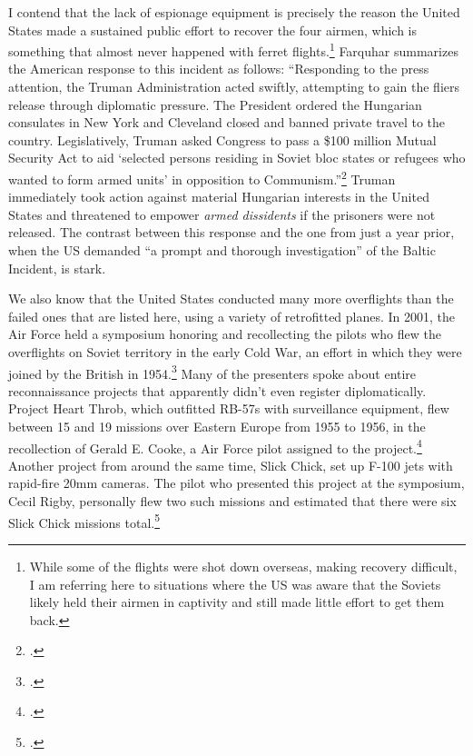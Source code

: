 \documentclass[14pt]{extarticle}
\begin{document}
I contend that the lack of espionage equipment is precisely the reason the United States made a sustained public effort to recover the four airmen, which is something that almost never happened with ferret flights.\footnote{While some of the flights were shot down overseas, making recovery difficult, I am referring here to situations where the US was aware that the Soviets likely held their airmen in captivity and still made little effort to get them back.} Farquhar summarizes the American response to this incident as follows: \enquote{Responding to the press attention, the Truman Administration acted swiftly, attempting to gain the fliers release through diplomatic pressure. The President ordered the Hungarian consulates in New York and Cleveland closed and banned private travel to the country. Legislatively, Truman asked Congress to pass a \$100 million Mutual Security Act to aid \enquote{selected persons residing in Soviet bloc states or refugees who wanted to form armed units} in opposition to Communism.}\footcite[p.~43]{farquhar_aerial_2015} Truman immediately took action against material Hungarian interests in the United States and threatened to empower \emph{armed dissidents} if the prisoners were not released. The contrast between this response and the one from just a year prior, when the US demanded \enquote{a prompt and thorough investigation} of the Baltic Incident, is stark.

We also know that the United States conducted many more overflights than the failed ones that are listed here, using a variety of retrofitted planes. In 2001, the Air Force held a symposium honoring and recollecting the pilots who flew the overflights on Soviet territory in the early Cold War, an effort in which they were joined by the British in 1954.\footcite[p.~v]{hall_early_2003} Many of the presenters spoke about entire reconnaissance projects that apparently didn't even register diplomatically. Project Heart Throb, which outfitted RB-57s with surveillance equipment, flew between 15 and 19 missions over Eastern Europe from 1955 to 1956, in the recollection of Gerald E. Cooke, a Air Force pilot assigned to the project.\footcite[p.~194]{hall_early_2003} Another project from around the same time, Slick Chick, set up F-100 jets with rapid-fire 20mm cameras. The pilot who presented this project at the symposium, Cecil Rigby, personally flew two such missions and estimated that there were six Slick Chick missions total.\footcite[p.~176]{hall_early_2003}
\end{document}
